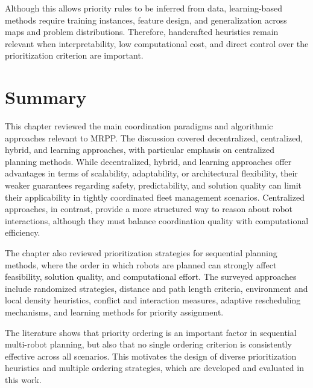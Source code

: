 Although this allows priority rules to be inferred from data, learning-based methods require
training instances, feature design, and generalization across maps and problem distributions.
Therefore, handcrafted heuristics remain relevant when interpretability, low computational cost, and
direct control over the prioritization criterion are important.


\section{Summary}
\label{sec:soa_summary}
\hspace{\parindent}
This chapter reviewed the main coordination paradigms and algorithmic approaches relevant to MRPP.
The discussion covered decentralized, centralized, hybrid, and learning approaches, with particular
emphasis on centralized planning methods. While decentralized, hybrid, and learning approaches offer
advantages in terms of scalability, adaptability, or architectural flexibility, their weaker
guarantees regarding safety, predictability, and solution quality can limit their applicability in
tightly coordinated fleet management scenarios. Centralized approaches, in contrast, provide a more
structured way to reason about robot interactions, although they must balance coordination quality
with computational efficiency.

The chapter also reviewed prioritization strategies for sequential planning methods, where the order
in which robots are planned can strongly affect feasibility, solution quality, and computational
effort. The surveyed approaches include randomized strategies, distance and path length criteria,
environment and local density heuristics, conflict and interaction measures, adaptive
rescheduling mechanisms, and learning methods for priority assignment.

The literature shows that priority ordering is an important factor in sequential multi-robot
planning, but also that no single ordering criterion is consistently effective across all scenarios.
This motivates the design of diverse prioritization heuristics and multiple ordering strategies,
which are developed and evaluated in this work.